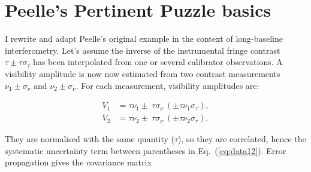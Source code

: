 \documentclass[a4paper,fleqn,usenatbib]{mnras}
\def\eqref#1{Eq.~(\ref{eq:#1})}
\def\norm{_\tau}
\def\meas{_\nu}
\def\system#1#2#3{\ensuremath{#1 \pm\ #2\ (\pm #3)}}
\def\raw{\ensuremath{\nu}}
\def\cot{\ensuremath{\tau}}
\def\data{\ensuremath{{\scriptstyle V}}}
\def\dev{\ensuremath{\sigma}}
\def\reldev{\ensuremath{\dev\norm}}
\def\absdev{\ensuremath{\dev\meas}}
\begin{document}
\section{Peelle's Pertinent Puzzle basics}
\label{sec:ppp}

I rewrite and adapt Peelle's original example in the context of long-baseline interferometry. Let's assume the inverse of the instrumental fringe contrast $\cot \pm \cot\reldev$ has been interpolated from one or several calibrator observations. A visibility amplitude is now now estimated from two contrast measurements $\raw_1 \pm \absdev$ and $\raw_2 \pm \absdev$.  For each measurement, visibility amplitudes are:

\begin{subequations}
\begin{align}
    \data_1 &= \system{\cot\raw_1}{\cot\absdev}{\cot\raw_1\reldev},\\
    \data_2 &= \system{\cot\raw_2}{\cot\absdev}{\cot\raw_2\reldev}.
\end{align}
\label{eq:data12}
\end{subequations}

They are normalised with the same quantity (\cot), so they are correlated, hence the systematic uncertainty term between parentheses in \eqref{data12}. Error propagation gives the covariance matrix
\end{document}
